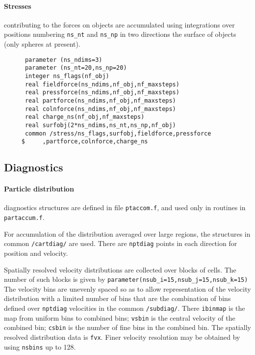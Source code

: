 \documentclass[12pt]{article}
\begin{document}
\paragraph{Stresses} contributing to the forces on objects are
accumulated using integrations over positions numbering \verb!ns_nt! and
\verb!ns_np! in two directions the surface of objects (only
spheres at present). 
\begin{verbatim}
      parameter (ns_ndims=3)
      parameter (ns_nt=20,ns_np=20)
      integer ns_flags(nf_obj)
      real fieldforce(ns_ndims,nf_obj,nf_maxsteps)
      real pressforce(ns_ndims,nf_obj,nf_maxsteps)
      real partforce(ns_ndims,nf_obj,nf_maxsteps)
      real colnforce(ns_ndims,nf_obj,nf_maxsteps)
      real charge_ns(nf_obj,nf_maxsteps)
      real surfobj(2*ns_ndims,ns_nt,ns_np,nf_obj)
      common /stress/ns_flags,surfobj,fieldforce,pressforce
     $     ,partforce,colnforce,charge_ns

\end{verbatim}

\subsection{Diagnostics}

\paragraph{Particle distribution} diagnostics structures are defined in file
\verb!ptaccom.f!, and used only in routines in \verb!partaccum.f!. 

For accumulation of the distribution averaged over large regions, the
structures in common \verb!/cartdiag/! are used. 
There are \verb!nptdiag! points in each direction for position and velocity.

Spatially resolved velocity distributions are collected over blocks of
cells. The number of such blocks is given by 
\verb!parameter(nsub_i=15,nsub_j=15,nsub_k=15)! 
The velocity bins are unevenly spaced so as to allow representation
of the velocity distribution with a limited number of bins that are
the combination of bins defined over \verb!nptdiag! velocities in the
common \verb!/subdiag/!.
There \verb!ibinmap! is the map from uniform bins to combined bins;
\verb!vsbin! is the central velocity of the combined bin; \verb!csbin!
is the number of fine bins in the combined bin. The spatially resolved
distribution data is \verb!fvx!. Finer velocity resolution may be
obtained by using \verb!nsbins! up to 128.
\end{document}
